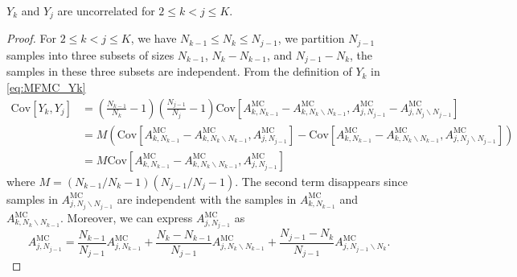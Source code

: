 \begin{lemma}\label{lemma:Y_k_Y_j}
$Y_k$ and $Y_j$ are uncorrelated  for $2\le k<j\le K$.


\begin{proof}
For $2\le k<j\le K$, we have $N_{k-1}\le N_k\le N_{j-1}$, we partition $N_{j-1}$ samples into three subsets of sizes $N_{k-1}$, $N_{k}-N_{k-1}$, and $N_{j-1} - N_{k}$, the samples in these three subsets are independent. From the definition of $Y_k$ in \eqref{eq:MFMC_Yk}
\begin{align*}
    \text{Cov}\left[Y_k,Y_j\right] &= \left(\frac{N_{k-1}}{N_k}-1\right) \left(\frac{N_{j-1}}{N_j}-1\right)\text{Cov}\left[A_{k, N_{k-1}}^{\text{MC}} - A_{k,N_{k}\backslash N_{k-1}}^{\text{MC}}, A_{j,N_{j-1}}^{\text{MC}} - A_{j,N_{j}\backslash N_{j-1}}^{\text{MC}}\right] \\
    & = M \left(\text{Cov}\left[A_{k,N_{k-1}}^{\text{MC}} - A_{k,N_{k}\backslash N_{k-1}}^{\text{MC}}, A_{j,N_{j-1}}^{\text{MC}}\right] - \text{Cov}\left[A_{k,N_{k-1}}^{\text{MC}} - A_{k,N_{k}\backslash N_{k-1}}^{\text{MC}}, A_{j,N_{j}\backslash N_{j-1}}^{\text{MC}}\right] \right)\\
    & = M \text{Cov}\left[A_{k,N_{k-1}}^{\text{MC}} - A_{k,N_{k}\backslash N_{k-1}}^{\text{MC}}, A_{j,N_{j-1}}^{\text{MC}}\right]
\end{align*}
where $M = (N_{k-1}/N_k-1) (N_{j-1}/N_j-1)$. The second term disappears since samples in $A_{j,N_{j}\backslash N_{j-1}}^{\text{MC}}$ are independent with the samples in $A_{k,N_{k-1}}^{\text{MC}}$ and $A_{k,N_{k}\backslash N_{k-1}}^{\text{MC}}$. Moreover, we can express $A_{j,N_{j-1}}^{\text{MC}}$ as
%
\begin{equation*}
    A_{j,N_{j-1}}^{\text{MC}} = \frac{N_{k-1}}{N_{j-1}}A_{j,N_{k-1}}^{\text{MC}} + \frac{N_k - N_{k-1}}{N_{j-1}} A_{j,N_{k}\backslash N_{k-1}}^{\text{MC}} + \frac{N_{j-1} - N_k}{N_{j-1}} A_{j,N_{j-1}\backslash N_{k}}^{\text{MC}}.
\end{equation*}
%


\end{proof}
\end{lemma}
